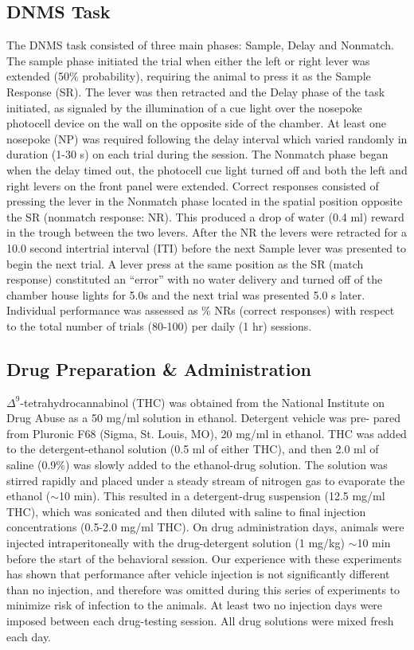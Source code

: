 \documentclass[11pt,a4paper,final]{article}
\begin{document}
    \subsection{DNMS Task}
The DNMS task consisted of three main phases: Sample, Delay and Nonmatch.
The sample phase initiated the trial when either the left or right lever was extended (50\% probability), requiring the animal to press it as the Sample Response (SR).
The lever was then retracted and the Delay phase of the task initiated, as signaled by the illumination of a cue light over the nosepoke photocell device on the wall on the opposite side of the chamber.
At least one nosepoke (NP) was required following the delay interval which varied randomly in duration (1-30 s) on each trial during the session.
The Nonmatch phase began when the delay timed out, the photocell cue light turned off and both the left and right levers on the front panel were extended. Correct responses consisted of pressing the lever in the Nonmatch phase located in the spatial position opposite the SR (nonmatch response: NR). This produced a drop of water (0.4 ml) reward in the trough between the two levers.
After the NR the levers were retracted for a 10.0 second intertrial interval (ITI) before the next Sample lever was presented to begin the next trial.
A lever press at the same position as the SR (match response) constituted an “error” with no water delivery and turned off of the chamber house lights for 5.0s and the next trial was presented 5.0 s later.
Individual performance was assessed as \% NRs (correct responses) with respect to the total number of trials (80-100) per daily (1 hr) sessions.

    \subsection{Drug Preparation \& Administration}
$\Delta^9$-tetrahydrocannabinol (THC) was obtained from the National Institute on Drug Abuse as a 50 mg/ml solution in ethanol.
Detergent vehicle was pre- pared from Pluronic F68 (Sigma, St. Louis, MO), 20 mg/ml in ethanol.
THC was added to the detergent-ethanol solution (0.5 ml of either THC), and then 2.0 ml of saline (0.9\%) was slowly added to the ethanol-drug solution.
The solution was stirred rapidly and placed under a steady stream of nitrogen gas to evaporate the ethanol ($\sim$10 min).
This resulted in a detergent-drug suspension (12.5 mg/ml THC), which was sonicated and then diluted with saline to final injection concentrations (0.5-2.0 mg/ml THC).
On drug administration days, animals were injected intraperitoneally with the drug-detergent solution (1 mg/kg) $\sim$10 min before the start of the behavioral session.
Our experience with these experiments has shown that performance after vehicle injection is not significantly different than no injection, and therefore was omitted during this series of experiments to minimize risk of infection to the animals.
At least two no injection days were imposed between each drug-testing session. All drug solutions were mixed fresh each day.
\end{document}
